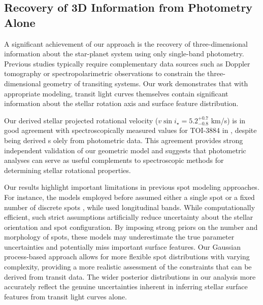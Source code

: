 \documentclass[twocolumn]{aastex631}
\newcommand{\sabinasays}[1]{{\color{purple}#1}}
\begin{document}
\subsection{Recovery of 3D Information from Photometry Alone}

A significant achievement of our approach is the recovery of three-dimensional information about the star-planet system using 
only single-band photometry. Previous studies typically require complementary data sources such as Doppler tomography or 
spectropolarimetric observations to constrain the three-dimensional geometry of transiting systems. 
Our work demonstrates that with appropriate modeling, transit light curves themselves contain significant information about 
the stellar rotation axis and surface feature distribution.

Our derived stellar projected rotational velocity ($v\sin i_\star = {5.2}^{+0.7}_{-0.8}$ km/s) is in good agreement 
with spectroscopically measured values for TOI-3884 in \cite{Libby-Roberts2023}, despite being derived s
olely from photometric data. This agreement provides strong independent validation of our geometric model 
and suggests that photometric analyses can serve as useful complements to spectroscopic methods for determining stellar 
rotational properties.

Our results highlight important limitations in previous spot modeling approaches. For instance, 
the models employed before assumed either a single spot or a fixed number of discrete spots 
\citep{Morris2018,Oshagh2013,Libby-Roberts2023,Beky2014}, \sabinasays{while \cite{Huber2010} used longitudinal bands}. 
While computationally efficient, 
such strict assumptions artificially reduce uncertainty about the stellar orientation and spot configuration. 
By imposing strong priors on the number and morphology of spots, these models may underestimate the true parameter 
uncertainties and potentially miss important surface features.
Our Gaussian process-based approach allows for more flexible spot distributions with varying complexity, 
providing a more realistic assessment of the constraints that can be derived from transit data. 
The wider posterior distributions in our analysis more accurately reflect the genuine uncertainties inherent in 
inferring stellar surface features from transit light curves alone. 
\end{document}
